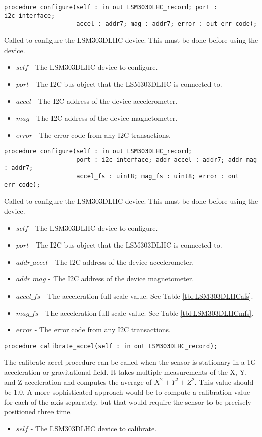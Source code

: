 \documentclass[10pt, openany]{book}
\begin{document}
\begin{lstlisting}
procedure configure(self : in out LSM303DLHC_record; port : i2c_interface;
                    accel : addr7; mag : addr7; error : out err_code);
\end{lstlisting}
Called to configure the LSM303DLHC device.  This must be done before using the device.
\begin{itemize}
  \item $self$ - The LSM303DLHC device to configure.
  \item $port$ - The I2C bus object that the LSM303DLHC is connected to.
  \item $accel$ - The I2C address of the device accelerometer.
  \item $mag$ - The I2C address of the device magnetometer.
  \item $error$ - The error code from any I2C transactions.
\end{itemize}

\begin{lstlisting}
procedure configure(self : in out LSM303DLHC_record;
                    port : i2c_interface; addr_accel : addr7; addr_mag : addr7;
                    accel_fs : uint8; mag_fs : uint8; error : out err_code);
\end{lstlisting}
Called to configure the LSM303DLHC device.  This must be done before using the device.
\begin{itemize}
  \item $self$ - The LSM303DLHC device to configure.
  \item $port$ - The I2C bus object that the LSM303DLHC is connected to.
  \item $addr\_accel$ - The I2C address of the device accelerometer.
  \item $addr\_mag$ - The I2C address of the device magnetometer.
  \item $accel\_fs$ - The acceleration full scale value.  See Table \ref{tbl:LSM303DLHCafs}.
  \item $mag\_fs$ - The acceleration full scale value.  See Table \ref{tbl:LSM303DLHCmfs}.
  \item $error$ - The error code from any I2C transactions.
\end{itemize}

\begin{lstlisting}
procedure calibrate_accel(self : in out LSM303DLHC_record);
\end{lstlisting}
The calibrate accel procedure can be called when the sensor is stationary in a 1G acceleration or gravitational field.  It takes multiple measurements of the X, Y, and Z acceleration and computes the average of $X^2 + Y^2 + Z^2$.  This value should be 1.0.  A more sophisticated approach would be to compute a calibration value for each of the axis separately, but that would require the sensor to be precisely positioned three time.
\begin{itemize}
  \item $self$ - The LSM303DLHC device to calibrate.
\end{itemize}
\end{document}
